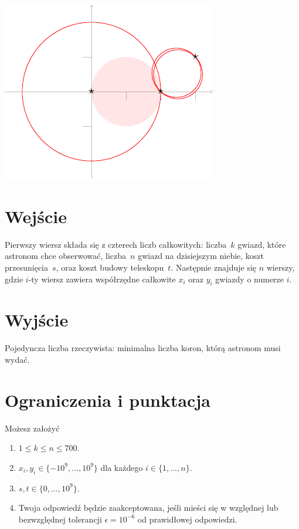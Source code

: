 \medskip
\noindent
\includegraphics[width=.3\textwidth]{img/samples.pdf}


\section*{Wejście}

Pierwszy wiersz składa się z czterech liczb całkowitych:
liczba~$k$ gwiazd, które astronom chce obserwować,
liczba~$n$ gwiazd na dzisiejszym niebie,
koszt przesunięcia~$s$, oraz
koszt budowy teleskopu~$t$.
Następnie znajduje się $n$ wierszy, gdzie $i$-ty wiersz zawiera współrzędne całkowite $x_i$ oraz $y_i$ gwiazdy o numerze $i$.

\section*{Wyjście}

Pojedyncza liczba rzeczywista: minimalna liczba koron, którą astronom musi wydać.

\section*{Ograniczenia i punktacja}

Możesz założyć 
\begin{enumerate}
\item $1\leq k\leq n\leq 700$. %
\item $x_i, y_i\in \{-10^9,\ldots, 10^9\}$ dla każdego $i\in\{1,\ldots,n\}$. %
\item $s,t\in \{0,\ldots, 10^9\}$. %
\item Twoja odpowiedź będzie zaakceptowana, jeśli mieści się w względnej lub bezwzględnej tolerancji $\epsilon = 10^{-6}$ od prawidłowej odpowiedzi.
\end{enumerate}


